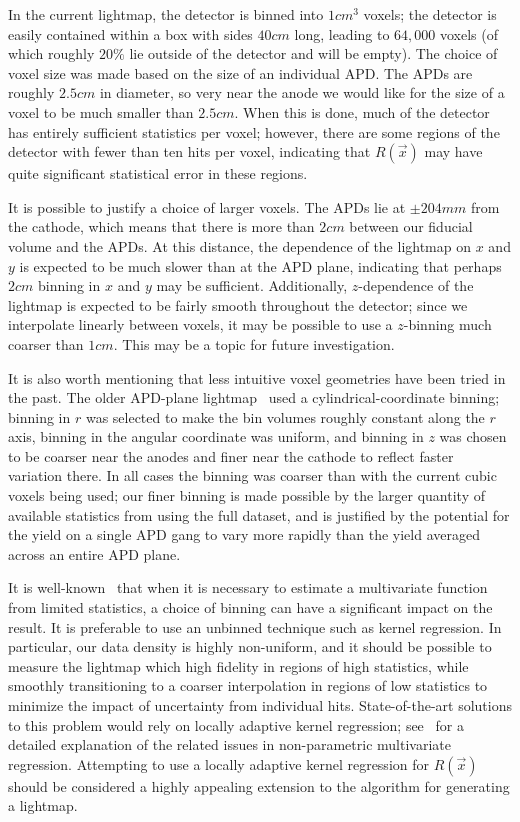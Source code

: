 In the current lightmap, the detector is binned into $1 cm^3$ voxels; the detector is easily contained within a box with sides $40 cm$ long, leading to $64,000$ voxels (of which roughly $20\%$ lie outside of the detector and will be empty).  The choice of voxel size was made based on the size of an individual APD.  The APDs are roughly $2.5 cm$ in diameter, so very near the anode we would like for the size of a voxel to be much smaller than $2.5 cm$.  When this is done, much of the detector has entirely sufficient statistics per voxel; however, there are some regions of the detector with fewer than ten hits per voxel, indicating that $R(\vec{x})$ may have quite significant statistical error in these regions.

It is possible to justify a choice of larger voxels.  The APDs lie at $\pm 204 mm$ from the cathode, which means that there is more than $2 cm$ between our fiducial volume and the APDs.  At this distance, the dependence of the lightmap on $x$ and $y$ is expected to be much slower than at the APD plane, indicating that perhaps $2 cm$ binning in $x$ and $y$ may be sufficient.  Additionally, $z$-dependence of the lightmap is expected to be fairly smooth throughout the detector; since we interpolate linearly between voxels, it may be possible to use a $z$-binning much coarser than $1 cm$.  This may be a topic for future investigation.

It is also worth mentioning that less intuitive voxel geometries have been tried in the past.  The older APD-plane lightmap~\cite{ThesisSteve} used a cylindrical-coordinate binning; binning in $r$ was selected to make the bin volumes roughly constant along the $r$ axis, binning in the angular coordinate was uniform, and binning in $z$ was chosen to be coarser near the anodes and finer near the cathode to reflect faster variation there.  In all cases the binning was coarser than with the current cubic voxels being used; our finer binning is made possible by the larger quantity of available statistics from using the full dataset, and is justified by the potential for the yield on a single APD gang to vary more rapidly than the yield averaged across an entire APD plane.

It is well-known~\cite{MultivariateDensityScott} that when it is necessary to estimate a multivariate function from limited statistics, a choice of binning can have a significant impact on the result.  It is preferable to use an unbinned technique such as kernel regression.  In particular, our data density is highly non-uniform, and it should be possible to measure the lightmap which high fidelity in regions of high statistics, while smoothly transitioning to a coarser interpolation in regions of low statistics to minimize the impact of uncertainty from individual hits.  State-of-the-art solutions to this problem would rely on locally adaptive kernel regression; see~\cite{MultivariateDensityScott} for a detailed explanation of the related issues in non-parametric multivariate regression.  Attempting to use a locally adaptive kernel regression for $R(\vec{x})$ should be considered a highly appealing extension to the algorithm for generating a lightmap.

